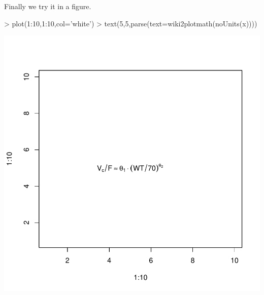 \documentclass[titlepage]{article}
\begin{document}
Finally we try it in a figure.
\begin{Schunk}
\begin{Sinput}
> plot(1:10,1:10,col='white')
> text(5,5,parse(text=wiki2plotmath(noUnits(x))))
\end{Sinput}
\end{Schunk}
\includegraphics{wikimath-figure}
\end{document}
